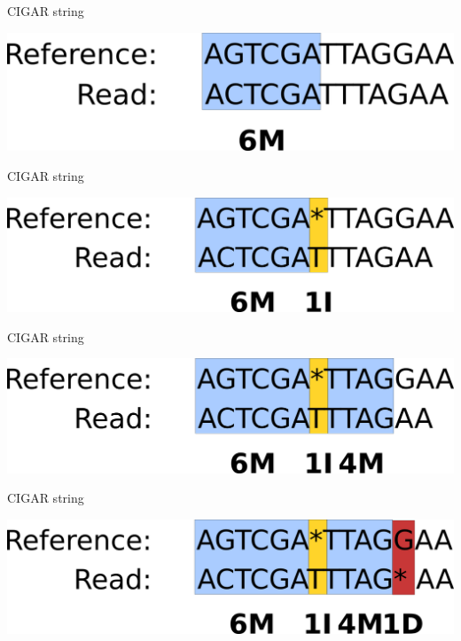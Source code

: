 \documentclass{beamer}
\begin{document}
\begin{frame}{CIGAR string}
  \begin{center}
    \includegraphics[width=\linewidth, keepaspectratio]{pic/c2.png}
  \end{center}
\end{frame}

\begin{frame}{CIGAR string}
  \begin{center}
    \includegraphics[width=\linewidth, keepaspectratio]{pic/c3.png}
  \end{center}
\end{frame}

\begin{frame}{CIGAR string}
  \begin{center}
    \includegraphics[width=\linewidth, keepaspectratio]{pic/c4.png}
  \end{center}
\end{frame}

\begin{frame}{CIGAR string}
  \begin{center}
    \includegraphics[width=\linewidth, keepaspectratio]{pic/c5.png}
  \end{center}
\end{frame}
\end{document}
